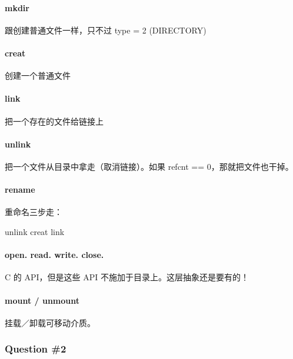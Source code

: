 \documentclass[
]{article}
\begin{document}
\hypertarget{header-n176}{%
\paragraph{mkdir}\label{header-n176}}

跟创建普通文件一样，只不过 type = 2 (DIRECTORY)

\hypertarget{header-n178}{%
\paragraph{creat}\label{header-n178}}

创建一个普通文件

\hypertarget{header-n180}{%
\paragraph{link}\label{header-n180}}

把一个存在的文件给链接上

\hypertarget{header-n182}{%
\paragraph{unlink}\label{header-n182}}

把一个文件从目录中拿走（取消链接）。如果 refcnt == 0，那就把文件也干掉。

\hypertarget{header-n184}{%
\paragraph{rename}\label{header-n184}}

重命名三步走：

unlink creat link

\hypertarget{header-n187}{%
\paragraph{open. read. write. close.}\label{header-n187}}

C 的 API，但是这些 API 不施加于目录上。这层抽象还是要有的！

\hypertarget{header-n189}{%
\paragraph{mount / unmount}\label{header-n189}}

挂载／卸载可移动介质。

\hypertarget{header-n191}{%
\subsubsection{Question \#2}\label{header-n191}}
\end{document}
